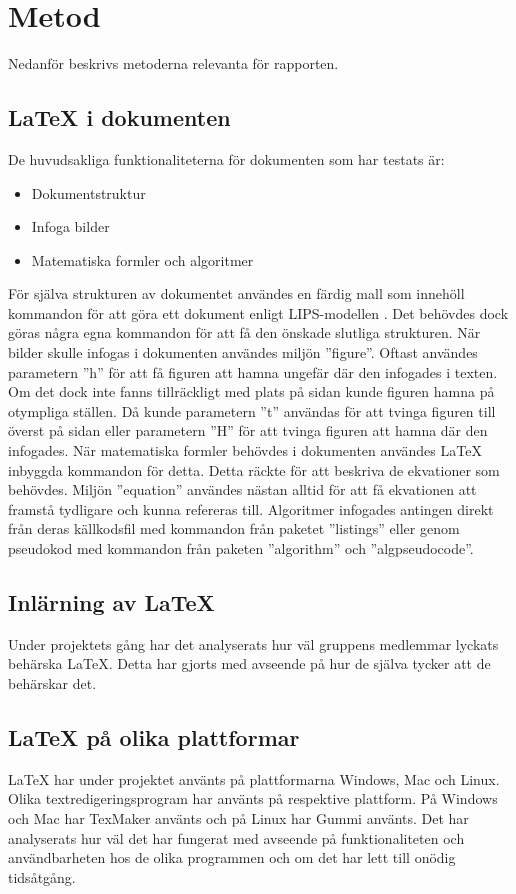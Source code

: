 \section{Metod}  
Nedanför beskrivs metoderna relevanta för rapporten.  

\subsection{{\LaTeX} i dokumenten}
De huvudsakliga funktionaliteterna för dokumenten som har testats är: 
\begin{itemize}
\item Dokumentstruktur
\item Infoga bilder
\item Matematiska formler och algoritmer
\end{itemize}   
För själva strukturen av dokumentet användes en färdig mall som innehöll kommandon för att göra ett dokument enligt LIPS-modellen \citep{lips}. Det behövdes dock göras några egna kommandon för att få den önskade slutliga strukturen. 
\newline
\newline
När bilder skulle infogas i dokumenten användes miljön ''figure''. Oftast användes parametern ''h'' för att få figuren att hamna ungefär där den infogades i texten. Om det dock inte fanns tillräckligt med plats på sidan kunde figuren hamna på otympliga ställen. Då kunde parametern ''t'' användas för att tvinga figuren till överst på sidan eller parametern ''H'' för att tvinga figuren att hamna där den infogades.
\newline
\newline
När matematiska formler behövdes i dokumenten användes {\LaTeX} inbyggda kommandon för detta. Detta räckte för att beskriva de ekvationer som behövdes. Miljön ''equation'' användes nästan alltid för att få ekvationen att framstå tydligare och kunna refereras till. Algoritmer infogades antingen direkt från deras källkodsfil med kommandon från paketet ''listings'' eller genom pseudokod med kommandon från paketen ''algorithm'' och ''algpseudocode''.  
     
\subsection{Inlärning av {\LaTeX}}
Under projektets gång har det analyserats hur väl gruppens medlemmar lyckats behärska {\LaTeX}. Detta har gjorts med avseende på hur de själva tycker att de behärskar det.      

\subsection{{\LaTeX} på olika plattformar}
{\LaTeX} har under projektet använts på plattformarna Windows, Mac och Linux. Olika textredigeringsprogram har använts på respektive plattform. På Windows och Mac har TexMaker använts och på Linux har Gummi använts. Det har analyserats hur väl det har fungerat med avseende på funktionaliteten och användbarheten hos de olika programmen och om det har lett till onödig tidsåtgång.   
